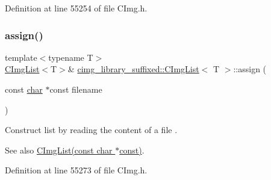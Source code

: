 Definition at line 55254 of file C\+Img.\+h.

\mbox{\label{structcimg__library__suffixed_1_1CImgList_aef5377b65794d5457dbc90b340e76530}} 
\subsubsection{\texorpdfstring{assign()}{assign()}\hspace{0.1cm}{\footnotesize\ttfamily [17/18]}}
{\footnotesize\ttfamily template$<$typename T$>$ \\
\hyperlink{structcimg__library__suffixed_1_1CImgList}{C\+Img\+List}$<$T$>$\& \hyperlink{structcimg__library__suffixed_1_1CImgList}{cimg\+\_\+library\+\_\+suffixed\+::\+C\+Img\+List}$<$ T $>$\+::assign (\begin{DoxyParamCaption}\item[{const \hyperlink{classchar}{char} $\ast$const}]{filename }\end{DoxyParamCaption})\hspace{0.3cm}{\ttfamily [inline]}}



Construct list by reading the content of a file . 

\begin{DoxySeeAlso}{See also}
\hyperlink{structcimg__library__suffixed_1_1CImgList_ac394d73bac5abc6aec337bc457695bdc}{C\+Img\+List(const char $\ast$const)}. 
\end{DoxySeeAlso}


Definition at line 55273 of file C\+Img.\+h.

\mbox{\label{structcimg__library__suffixed_1_1CImgList_ad0c3f5457500c8ca681b6e57c8884b35}} 
